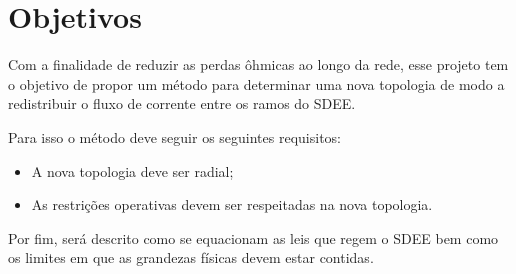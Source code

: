 \section{Objetivos}

Com a finalidade de reduzir as perdas ôhmicas ao longo da rede, esse projeto tem o objetivo de propor um método para determinar uma nova topologia de modo a redistribuir o fluxo de corrente entre os ramos do SDEE.

Para isso o método deve seguir os seguintes requisitos:

\begin{itemize}
    \item A nova topologia deve ser radial;
    
    \item As restrições operativas devem ser respeitadas na nova topologia. %
\end{itemize}

Por fim, será descrito como se equacionam as leis que regem o SDEE bem como os limites em que as grandezas físicas devem estar contidas.
